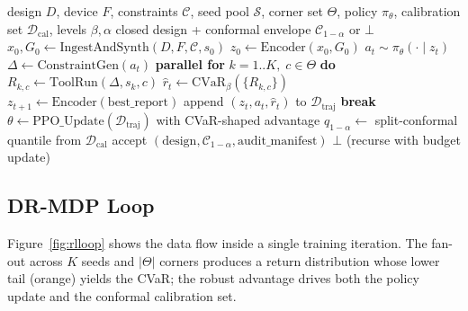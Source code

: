\documentclass[journal]{IEEEtran}
\begin{document}
\begin{algorithm}[t]
\caption{\textsc{Robin-FPGA} episode}
\label{alg:robin}
\begin{algorithmic}[1]
\Require design $D$, device $F$, constraints $\mathcal{C}$, seed pool $\mathcal{S}$, corner set $\Theta$, policy $\pi_\theta$, calibration set $\mathcal{D}_{\text{cal}}$, levels $\beta, \alpha$
\Ensure closed design + conformal envelope $\mathcal{C}_{1-\alpha}$ or $\bot$
\State $x_0, G_0 \gets \mathrm{IngestAndSynth}(D, F, \mathcal{C}, s_0)$
\State $z_0 \gets \mathrm{Encoder}(x_0, G_0)$
  \State $a_t \sim \pi_\theta(\cdot \mid z_t)$
  \State $\Delta \gets \mathrm{ConstraintGen}(a_t)$
  \State \textbf{parallel for} $k = 1..K,\; c \in \Theta$ \textbf{do}
  \State \quad $R_{k,c} \gets \mathrm{ToolRun}(\Delta, s_k, c)$
  \State $\hat{r}_t \gets \mathrm{CVaR}_{\beta}(\{R_{k,c}\})$ 
  \State $z_{t+1} \gets \mathrm{Encoder}(\mathrm{best\_report})$
  \State append $(z_t, a_t, \hat r_t)$ to $\mathcal{D}_{\text{traj}}$
   \textbf{break} \EndIf
\EndFor
\State $\theta \gets \mathrm{PPO\_Update}(\mathcal{D}_{\text{traj}})$ with CVaR-shaped advantage 
\State $q_{1-\alpha} \gets$ split-conformal quantile from $\mathcal{D}_{\text{cal}}$ 
  \State \Return accept $(\text{design}, \mathcal{C}_{1-\alpha}, \text{audit\_manifest})$
\Else
  \State \Return $\bot$ (recurse with budget update)
\EndIf
\end{algorithmic}
\end{algorithm}

\subsection{DR-MDP Loop}
Figure~\ref{fig:rlloop} shows the data flow inside a single training iteration. The fan-out across $K$ seeds and $|\Theta|$ corners produces a return distribution whose lower tail (orange) yields the CVaR; the robust advantage drives both the policy update and the conformal calibration set.
\end{document}
